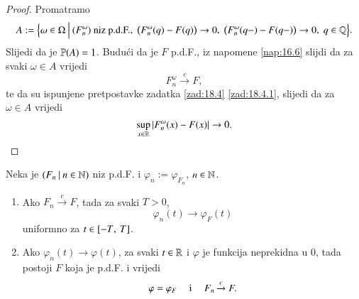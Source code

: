 \begin{proof}
    Promatramo
    \begin{equation*}
        A := \Big\{{\omega \in \Omega} \: \Big| \: {(F^\omega_n) \textnormal{ niz p.d.F.}, \; \big(F^\omega_n (q) - F(q) \big) \to 0, \; \big( F^\omega_n (q-) - F(q-) \big) \to 0, \; q \in \mathbb{Q}}\Big\}.
    \end{equation*}
    Slijedi da je $\mathbb{P} (A) = 1$.
    Budu\' ci da je $F$ p.d.F., iz napomene \ref{nap:16.6} slijdi da za svaki $\omega \in A$ vrijedi
    \begin{equation*}
        F^\omega_n \xrightarrow{c} F,
    \end{equation*}
    te da su ispunjene pretpostavke zadatka \ref{zad:18.4} \ref{zad:18.4.1}, slijedi da za $\omega \in A$ vrijedi
    \begin{equation*}
        \sup\limits_{x \in \mathbb{R}} |F^\omega_n (x) - F(x)| \to 0.
    \end{equation*}
\end{proof}

\begin{tm}  \label{tm:18.6}
    \quad \newline
    Neka je $({F_n} \: | \: {n \in \mathbb{N}})$ niz p.d.F. i $\varphi_n := \varphi_{F_n}$, $n \in \mathbb{N}$.
    \begin{enumerate}[label=(\roman*)]
        \item   \label{tm:18.6.1}
        Ako $F_n \xrightarrow{c} F$, tada za svaki $T > 0$,
        \begin{equation*}
            \varphi_n (t) \to \varphi_F (t)
        \end{equation*}
        uniformno za $t \in [{-T}, \:{T}]$.
        \item   \label{tm:18.6.2}
        Ako $\varphi_n (t) \to \varphi (t)$, za svaki $t \in \mathbb{R}$ i $\varphi$ je funkcija neprekidna u $0$, tada postoji $F$ koja je p.d.F. i vrijedi
        \begin{equation*}
            \varphi = \varphi_F \quad \textnormal{ i } \quad F_n \xrightarrow{c} F.
        \end{equation*}
    \end{enumerate}
\end{tm}

